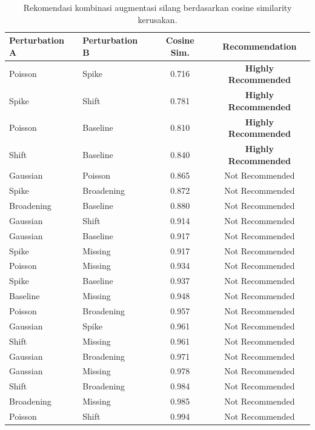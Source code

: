 \begin{table}[H]
\centering
\caption{Rekomendasi kombinasi augmentasi silang berdasarkan cosine similarity kerusakan.}
\label{tab:aug_combinations}
\begin{tabular}{llcc}
\toprule
\textbf{Perturbation A} & \textbf{Perturbation B} & \textbf{Cosine Sim.} & \textbf{Recommendation} \\
\midrule
Poisson & Spike & 0.716 & \textbf{Highly Recommended} \\
Spike & Shift & 0.781 & \textbf{Highly Recommended} \\
Poisson & Baseline & 0.810 & \textbf{Highly Recommended} \\
Shift & Baseline & 0.840 & \textbf{Highly Recommended} \\
Gaussian & Poisson & 0.865 & Not Recommended \\
Spike & Broadening & 0.872 & Not Recommended \\
Broadening & Baseline & 0.880 & Not Recommended \\
Gaussian & Shift & 0.914 & Not Recommended \\
Gaussian & Baseline & 0.917 & Not Recommended \\
Spike & Missing & 0.917 & Not Recommended \\
Poisson & Missing & 0.934 & Not Recommended \\
Spike & Baseline & 0.937 & Not Recommended \\
Baseline & Missing & 0.948 & Not Recommended \\
Poisson & Broadening & 0.957 & Not Recommended \\
Gaussian & Spike & 0.961 & Not Recommended \\
Shift & Missing & 0.961 & Not Recommended \\
Gaussian & Broadening & 0.971 & Not Recommended \\
Gaussian & Missing & 0.978 & Not Recommended \\
Shift & Broadening & 0.984 & Not Recommended \\
Broadening & Missing & 0.985 & Not Recommended \\
Poisson & Shift & 0.994 & Not Recommended \\
\bottomrule
\end{tabular}
\end{table}
